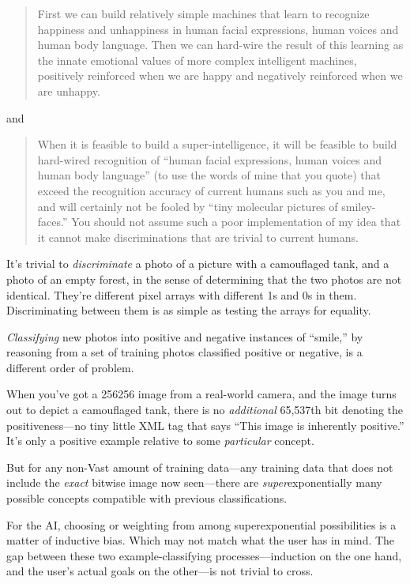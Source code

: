 \begin{quote}
{
 First we can build relatively simple machines that learn to
recognize happiness and unhappiness in human facial expressions, human
voices and human body language. Then we can hard-wire the result of
this learning as the innate emotional values of more complex
intelligent machines, positively reinforced when we are happy and
negatively reinforced when we are unhappy.}
\end{quote}


 and

\begin{quote}
{
 When it is feasible to build a super-intelligence, it will be
feasible to build hard-wired recognition of ``human
facial expressions, human voices and human body
language'' (to use the words of mine that you quote)
that exceed the recognition accuracy of current humans such as you and
me, and will certainly not be fooled by ``tiny
molecular pictures of smiley-faces.'' You should not
assume such a poor implementation of my idea that it cannot make
discriminations that are trivial to current humans.}
\end{quote}


 It's trivial to \textit{discriminate} a photo of a
picture with a camouflaged tank, and a photo of an empty forest, in the
sense of determining that the two photos are not identical.
They're different pixel arrays with different 1s and 0s
in them. Discriminating between them is as simple as testing the arrays
for equality.


 \textit{Classifying} new photos into positive and negative
instances of ``smile,'' by reasoning
from a set of training photos classified positive or negative, is a
different order of problem.


 When you've got a 256{\texttimes}256 image from a
real-world camera, and the image turns out to depict a camouflaged
tank, there is no \textit{additional} 65,537th bit denoting the
positiveness---no tiny little XML tag that says ``This
image is inherently positive.'' It's
only a positive example relative to some \textit{particular} concept.


 But for any non-Vast amount of training data---any training data
that does not include the \textit{exact} bitwise image now seen---there
are \textit{super}exponentially many possible concepts compatible with
previous classifications.


 For the AI, choosing or weighting from among superexponential
possibilities is a matter of inductive bias. Which may not match what
the user has in mind. The gap between these two example-classifying
processes---induction on the one hand, and the user's
actual goals on the other---is not trivial to cross.


